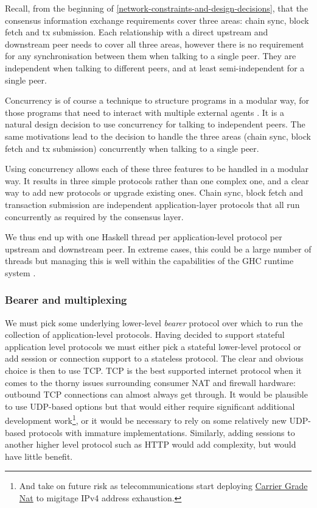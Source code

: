 \documentclass[11pt,a4paper]{article}
\begin{document}
Recall, from the beginning of
\cref{network-constraints-and-design-decisions}, that the consensus information exchange requirements cover three
areas: chain sync, block fetch and tx submission. Each relationship with
a direct upstream and downstream peer needs to cover all three areas,
however there is no requirement for any synchronisation between them
when talking to a single peer. They are independent when talking to
different peers, and at least semi-independent for a single peer.

Concurrency is of course a technique to structure programs in a modular
way, for those programs that need to interact with multiple external
agents \cite[Chapter 1]{Marlow13}. It is a natural design decision to use
concurrency for talking to independent peers. The same motivations lead
to the decision to handle the three areas (chain sync, block fetch and
tx submission) concurrently when talking to a single peer.

Using concurrency allows each of these three features to be handled in a
modular way. It results in three simple protocols rather than one
complex one, and a clear way to add new protocols or upgrade existing
ones. Chain sync, block fetch and transaction submission are independent
application-layer protocols that all run concurrently as required by the
consensus layer.

We thus end up with one Haskell thread per application-level protocol
per upstream and downstream peer. In extreme cases, this could be a
large number of threads but managing this is well within the
capabilities of the GHC runtime system \cite[Chapter 15]{Marlow13}.

\subsubsection{Bearer and multiplexing}
\label{bearer-and-multiplexing}

We must pick some underlying lower-level \emph{bearer} protocol over
which to run the collection of application-level protocols. Having
decided to support stateful application level protocols we must either
pick a stateful lower-level protocol or add session or connection
support to a stateless protocol. The clear and obvious choice is then to
use TCP. TCP is the best supported internet protocol when it comes to
the thorny issues surrounding consumer NAT and firewall hardware:
outbound TCP connections can almost always get through. It would be
plausible to use UDP-based options but that would either require
significant additional development work\footnote{And take on future risk
  as telecommunications start deploying
  \href{https://en.wikipedia.org/wiki/Carrier-grade_NAT}{{Carrier Grade
  Nat}} to migitage IPv4 address exhaustion.}, or it would be necessary
to rely on some relatively new UDP-based protocols with immature
implementations. Similarly, adding sessions to another higher level
protocol such as HTTP would add complexity, but would have little
benefit.
\end{document}
